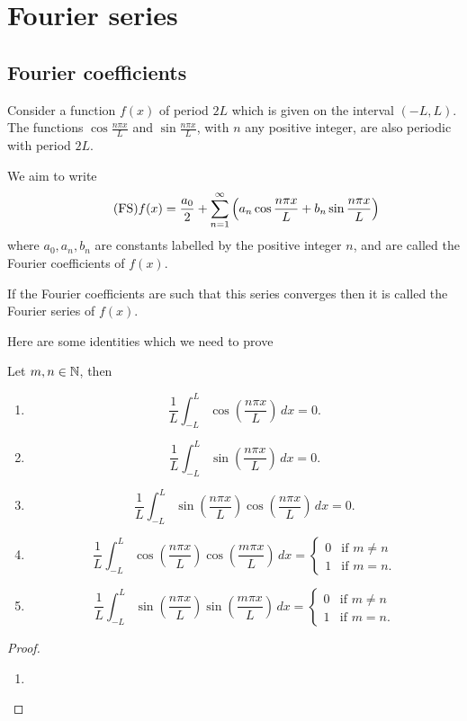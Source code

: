 \documentclass[10pt, a4paper]{article}
\begin{document}
\newpage

\section{Fourier series}

\subsection{Fourier coefficients}
Consider a function $f(x)$ of period $2L$ which is given on the interval $(-L, L)$.
The functions $\cos\frac{n\pi x}{L}$ and $\sin\frac{n\pi x}{L}$,
with $n$ any positive integer,
are also periodic with period $2L$.

We aim to write
\begin{equation}\tag{FS}
    f(x) = \frac{a_0}{2} + \infsum[n = 1]\left(a_n\cos{\frac{n\pi x}{L}} + b_n\sin{\frac{n\pi x}{L}}\right)
\end{equation}
where $a_0, a_n, b_n$ are constants labelled by the positive integer $n$,
and are called the Fourier coefficients of $f(x)$.

If the Fourier coefficients are such that this series converges then it is called the Fourier series of $f(x)$.

Here are some identities which we need to prove
\begin{lemma}
    Let $m, n \in \N$,
    then
    \begin{enumerate}[label = \roman*)]
        \item
        \[
        \frac{1}{L}\int_{-L}^{L}\cos\left(\frac{n\pi x}{L}\right)\,dx = 0.
        \]
        \item
        \[
        \frac{1}{L}\int_{-L}^{L}\sin\left(\frac{n\pi x}{L}\right)\,dx = 0.
        \]
        \item
        \[
        \frac{1}{L}\int_{-L}^{L}\sin\left(\frac{n\pi x}{L}\right)\cos\left(\frac{n\pi x}{L}\right)\,dx = 0.
        \]
        \item
        \[
        \frac{1}{L}\int_{-L}^{L}\cos\left(\frac{n\pi x}{L}\right)\cos\left(\frac{m\pi x}{L}\right)\,dx = \begin{cases}
            0 & \text{if } m \neq n \\
            1 & \text{if } m = n.
        \end{cases}
        \]
        \item
        \[
        \frac{1}{L}\int_{-L}^{L}\sin\left(\frac{n\pi x}{L}\right)\sin\left(\frac{m\pi x}{L}\right)\,dx = \begin{cases}
            0 & \text{if } m \neq n \\
            1 & \text{if } m = n.
        \end{cases}
        \]
    \end{enumerate}
    \begin{proof}
        \begin{enumerate}[label = \roman*)]
            \item
        \end{enumerate}
    \end{proof}
\end{lemma}
\end{document}
